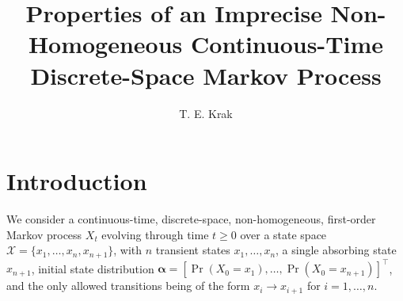 \documentclass[10pt]{article}
\begin{document}
\title{Properties of an Imprecise Non-Homogeneous Continuous-Time Discrete-Space Markov Process}
\author{T. E. Krak}
\maketitle



\section{Introduction}\label{sec:one}

We consider a continuous-time, discrete-space, non-homogeneous, first-order Markov process $X_t$ evolving through time $t\geq 0$ over a state space $\mathcal{X}=\{x_1,\ldots,x_n,x_{n+1}\}$, with $n$ transient states $x_1,\ldots,x_n$, a single absorbing state $x_{n+1}$, initial state distribution $\boldsymbol{\alpha}=[\Pr(X_0=x_1),\ldots,\Pr(X_0=x_{n+1})]^\top$, and the only allowed transitions being of the form $x_i\rightarrow x_{i+1}$ for $i=1,\ldots,n$. 
\end{document}
